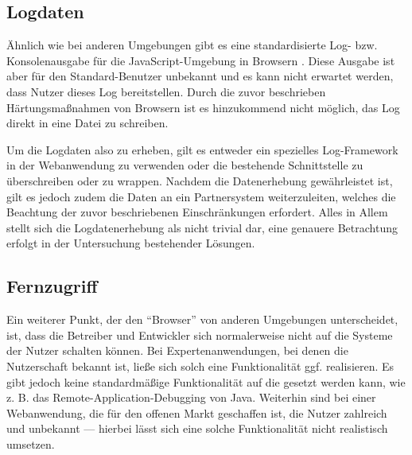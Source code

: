 \subsection{Logdaten}
\label{sec:logdaten}

Ähnlich wie bei anderen Umgebungen gibt es eine standardisierte Log- bzw. Konsolenausgabe für die JavaScript-Umgebung in Browsern \cite{MDNConsole}. Diese Ausgabe ist aber für den Standard-Benutzer unbekannt und es kann nicht erwartet werden, dass Nutzer dieses Log bereitstellen. Durch die zuvor beschrieben Härtungsmaßnahmen von Browsern ist es hinzukommend nicht möglich, das Log direkt in eine Datei zu schreiben.

Um die Logdaten also zu erheben, gilt es entweder ein spezielles Log-Framework in der Webanwendung zu verwenden oder die bestehende Schnittstelle zu überschreiben oder zu wrappen. Nachdem die Datenerhebung gewährleistet ist, gilt es jedoch zudem die Daten an ein Partnersystem weiterzuleiten, welches die Beachtung der zuvor beschriebenen Einschränkungen erfordert. Alles in Allem stellt sich die Logdatenerhebung als nicht trivial dar, eine genauere Betrachtung erfolgt in der Untersuchung bestehender Lösungen.

\subsection{Fernzugriff}

Ein weiterer Punkt, der den \enquote{Browser} von anderen Umgebungen unterscheidet, ist, dass die Betreiber und Entwickler sich normalerweise nicht auf die Systeme der Nutzer schalten können. Bei Expertenanwendungen, bei denen die Nutzerschaft bekannt ist, ließe sich solch eine Funktionalität ggf. realisieren. Es gibt jedoch keine standardmäßige Funktionalität auf die gesetzt werden kann, wie z. B. das Remote-Application-Debugging \cite{JavaDebugWireProtocol} von Java. Weiterhin sind bei einer Webanwendung, die für den offenen Markt geschaffen ist, die Nutzer zahlreich und unbekannt --- hierbei lässt sich eine solche Funktionalität nicht realistisch umsetzen.